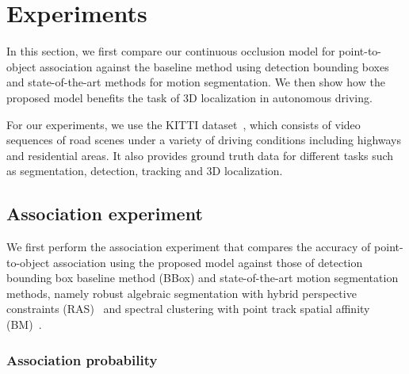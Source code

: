 \section{Experiments}
\label{sec:experiments}

In this section, we first compare our continuous occlusion model for point-to-object association against the baseline method using detection bounding boxes and state-of-the-art methods for motion segmentation. We then show how the proposed model benefits the task of 3D localization in autonomous driving.

For our experiments, we use the KITTI dataset~\cite{geiger2013vision}, which consists of video sequences of road scenes under a variety of driving conditions including highways and residential areas. It also provides ground truth data for different tasks such as segmentation, detection, tracking and 3D localization.



\subsection{Association experiment}

We first perform the association experiment that compares the accuracy of point-to-object association using the proposed model against those of detection bounding box baseline method (BBox) and state-of-the-art motion segmentation methods, namely robust algebraic segmentation with hybrid perspective constraints (RAS)~\cite{Rao_etal_2010} and spectral clustering with point track spatial affinity (BM)~\cite{Brox_Malik_2010}.


\subsubsection{Association probability}

